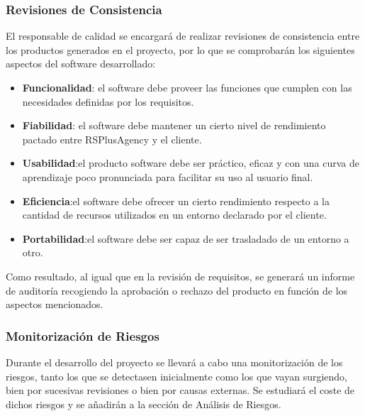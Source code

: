 \subsubsection{Revisiones de Consistencia}
\par El responsable de calidad se encargará de realizar revisiones de consistencia entre los productos generados en el proyecto, por lo que se comprobarán los siguientes aspectos del software desarrollado:

\begin{itemize}
\item \textbf{Funcionalidad}: el software debe proveer las funciones que cumplen con las necesidades definidas por los requisitos.
\item \textbf{Fiabilidad}: el software debe mantener un cierto nivel de rendimiento pactado entre RSPlusAgency y el cliente.
\item \textbf{Usabilidad}:el producto software debe ser práctico, eficaz y con una curva de aprendizaje poco pronunciada para facilitar su uso al usuario final.
\item \textbf{Eficiencia}:el software debe ofrecer un cierto rendimiento respecto a la cantidad de recursos utilizados en un entorno declarado por el cliente.
\item \textbf{Portabilidad}:el software debe ser capaz de ser trasladado de un entorno a otro.
\end{itemize}

\par Como resultado, al igual que en la revisión de requisitos, se generará un informe de auditoría recogiendo la aprobación o rechazo del producto en función de los aspectos mencionados.

\subsubsection{Monitorización de Riesgos}
\par Durante el desarrollo del proyecto se llevará a cabo una monitorización de los riesgos, tanto los que se detectasen inicialmente como los que vayan surgiendo, bien por sucesivas revisiones o bien por causas externas. Se estudiará el coste de dichos riesgos y se añadirán a la sección de Análisis de Riesgos.